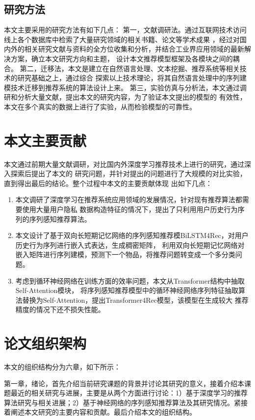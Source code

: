 \subsection{研究方法}
本文主要采用的研究方法有如下几点：
第一，文献调研法。通过互联网技术访问线上各个数据库中检索了大量研究领域的相关书籍、论文等学术成果%
，经过对国内外的相关研究文献与资料的全方位收集和分析，并结合工业界应用领域的最新解决方案，确立本文研究方向和主题，%
设计本文推荐模型框架及各模块之间的耦合。
第二，迁移法，本文是建立在自然语言处理、文本挖掘、推荐系统等相关技术的研究基础之上，通过综合%
探索以上技术理论，将其自然语言处理中的序列建模技术迁移到推荐系统的算法设计上来。
第三，实验仿真与分析法，本文通过调研和分析大量文献，提出本文的研究内容，为了验证本文提出的模型的%
有效性，本文在多个真实的数据上进行了实验，从而检验模型的可靠性。

\section{本文主要贡献}
本文通过前期大量文献调研，对比国内外深度学习推荐技术上进行的研究，通过深入探索后提出了本文的%
研究问题，并针对提出的问题进行了大规模的对比实验，直到得出最后的结论。整个过程中本文的主要贡献体现%
出如下几点：
\begin{enumerate}
    \item 本文调研了深度学习在推荐系统应用领域的发展情况，针对现有推荐算法都需要使用大量用户隐私%
          数据构造特征的情况下，提出了只利用用户历史行为序列的序列感知推荐算法。
    \item 本文设计了基于双向长短期记忆网络的序列感知推荐模BiLSTM4Rec，对用户历史行为序列进行嵌入式表达，生成稠密矩阵，%
          利用双向长短期记忆网络对嵌入矩阵进行序列建模，预测下一个物品，将推荐问题转变成一个多分类问题。
    \item 考虑到循环神经网络在训练方面的效率问题，本文从Transformer结构中抽取Self-Attention模块，%
          将序列感知推荐模型中的循环神经网络序列特征抽取算法替换为Self-Attention，提出Transformer4Rec模型，该模型在生成较大%
          推荐精度的情况下还不损失性能。
\end{enumerate}


\section{论文组织架构}
本文的组织结构分为六章，如下所示：

第一章，绪论，首先介绍当前研究课题的背景并讨论其研究的意义，接着介绍本课题最近的相关研究与进展，主要是从两个方面进行讨论：1）基于深度学习的推荐算法研究与相关进展；2）基于神经网络的序列感知推荐算法及其研究情况。紧接着阐述本文研究的主要内容和贡献。最后介绍本文的组织结构。


